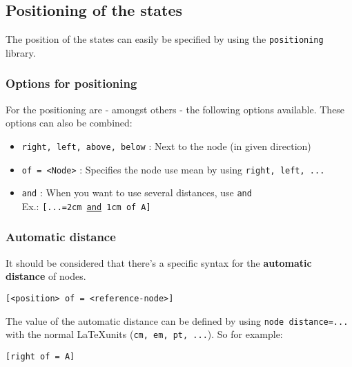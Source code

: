 \documentclass[../../../include/open-logic-chapter]{subfiles}
\begin{document}
	\subsection{Positioning of the states}
		The position of the states can easily be specified by using the \texttt{positioning} library.
		\subsubsection{Options for positioning}
		For the positioning are - amongst others - the following options available. These options can also be combined:\\
		\begin{itemize}
			\item \texttt{right, left, above, below} : Next to the node (in given direction)
			\item \texttt{of = <Node>} : Specifies the node use mean by using \texttt{right, left, ...}
			\item \texttt{and} : When you want to use several distances, use \texttt{and}\\
			Ex.: \texttt{[...=2cm \underline{and} 1cm of A]}
		\end{itemize}
		\subsubsection{Automatic distance}
		It should be considered that there's a specific syntax for the \textbf{automatic distance} of nodes.\\

			\begin{lstlisting}[caption={Syntax for the positioning of nodes.}]
[<position> of = <reference-node>]
			\end{lstlisting}

		The value of the automatic distance can be defined by using \texttt{node distance=...} with the normal \LaTeX units (\texttt{cm, em, pt, ...}).
		So for example:\\

			\begin{lstlisting}[mathescape,caption={Automatic positioning of a node to the right of A.}]
[right of = A]
			\end{lstlisting}
\end{document}
